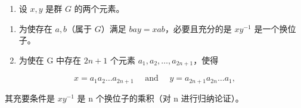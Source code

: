 \begin{enumerate}
\def\labelenumi{\arabic{enumi}。}
\setcounter{enumi}{40}
\tightlist
\item
  设 \(x, y\) 是群 \(G\) 的两个元素。
\end{enumerate}

\begin{enumerate}
\def\labelenumi{(\alph{enumi})}
\item
  为使存在 \(a, b\)（属于 \(G\)）满足 \(bay = xab\)，必要且充分的是 \(xy^{-1}\) 是一个换位子。
\item
  为使在 G 中存在 \(2n + 1\) 个元素 \(a_1, a_2, \ldots, a_{2n+1}\)，使得
\end{enumerate}

\[
x = a _ {1} a _ {2} \dots a _ {2 n + 1} \quad \text { and } \quad y = a _ {2 n + 1} a _ {2 n} \dots a _ {1},
\]

其充要条件是 \(xy^{-1}\) 是 n 个换位子的乘积（对 n 进行归纳论证）。

